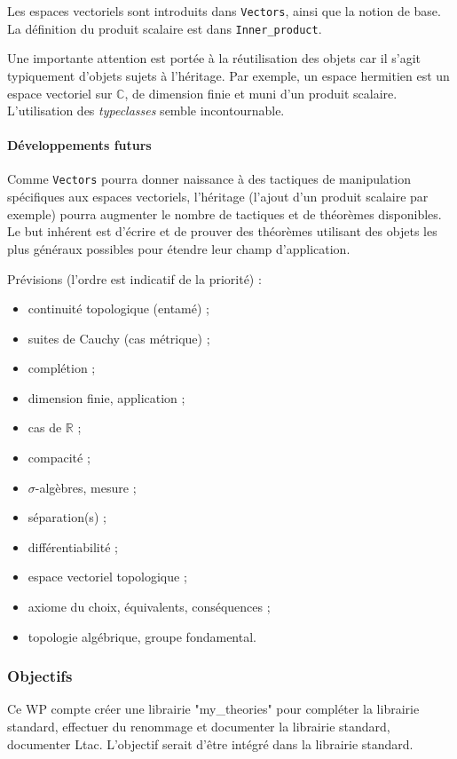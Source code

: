\documentclass[a4paper,10pt]{article}
\newcommand{\coqcode}[1]{\texttt{#1}}
\begin{document}
Les espaces vectoriels sont introduits dans \coqcode{Vectors}, ainsi que la notion de base. La définition du produit scalaire est dans \coqcode{Inner\_product}.

Une importante attention est portée à la réutilisation des objets car il s'agit typiquement d'objets sujets à l'héritage. Par exemple, un espace hermitien est un espace vectoriel sur $\mathbb{C}$, de dimension finie et muni d'un produit scalaire. L'utilisation des \emph{typeclasses} semble incontournable.

\paragraph{Développements futurs}

Comme \coqcode{Vectors} pourra donner naissance à des tactiques de manipulation spécifiques aux espaces vectoriels, l'héritage (l'ajout d'un produit scalaire par exemple) pourra augmenter le nombre de tactiques et de théorèmes disponibles. Le but inhérent est d'écrire et de prouver des théorèmes utilisant des objets les plus généraux possibles pour étendre leur champ d'application.

Prévisions (l'ordre est indicatif de la priorité) :
\begin{itemize}
  \item continuité topologique (entamé) ;
  \item suites de Cauchy (cas métrique) ;
  \item complétion ;
  \item dimension finie, application ;
  \item cas de $\mathbb{R}$ ;
  \item compacité ;
  \item $\sigma$-algèbres, mesure ;
  \item séparation(s) ;
  \item différentiabilité ;
  \item espace vectoriel topologique ;
  \item axiome du choix, équivalents, conséquences ;
  \item topologie algébrique, groupe fondamental.
\end{itemize}


\subsubsection*{Objectifs}
Ce WP compte créer une librairie "my\_theories" pour compléter la librairie standard, effectuer du renommage et documenter la librairie standard, 
documenter Ltac. L'objectif serait d'être intégré dans la librairie standard.
\end{document}
